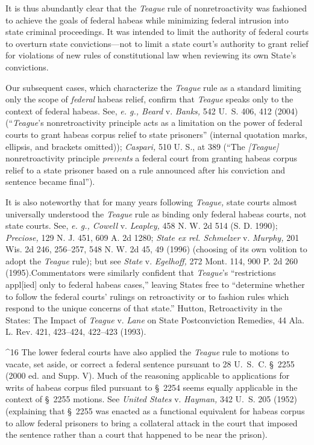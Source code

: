 {{{  It is thus abundantly clear that the \emph{Teague} rule of
nonretroactivity was fashioned to achieve the goals of federal habeas
while minimizing federal intrusion into state criminal proceedings. It
was intended to limit the authority of federal courts to overturn state
convictions---not to limit a state court's authority to grant relief
for violations of new \newpage  rules of constitutional law when reviewing
its own State's convictions.\footnotemark[16]

  Our subsequent cases, which characterize the \emph{Teague} rule as
a standard limiting only the scope of \emph{federal} habeas relief,
confirm that \emph{Teague} speaks only to the context of federal habeas.
See, \emph{e. g., Beard} v. \emph{Banks,} 542 U.~S. 406, 412 (2004)
(``\emph{Teague}'s nonretroactivity principle acts as a limitation
on the power of federal courts to grant habeas corpus relief to
state prisoners'' (internal quotation marks, ellipsis, and brackets
omitted)); \emph{Caspari,} 510 U. S., at 389 (``The \emph{[Teague]}
nonretroactivity principle \emph{prevents} a federal court from granting
habeas corpus relief to a state prisoner based on a rule announced after
his conviction and sentence became final'').

  It is also noteworthy that for many years following \emph{Teague,} state
courts almost universally understood the \emph{Teague} rule as binding only
federal habeas courts, not state courts. See, \emph{e. g., Cowell} v.
\emph{Leapley,} 458 N. W. 2d 514 (S. D. 1990); \emph{Preciose,} 129 N. J. 451,
609 A. 2d 1280; \emph{State ex rel. Schmelzer} v. \emph{Murphy,} 201 Wis. 2d
246, 256--257, 548 N. W. 2d 45, 49 (1996) (choosing of its own volition
to adopt the \emph{Teague} rule); but see \emph{State} v. \emph{Egelhoff,} 272
Mont. 114, 900 P. 2d 260 (1995).\footnotemark[17] Commentators were similarly
confident that \emph{Teague}'s ``restrictions appl[ied] only to federal
habeas \newpage  cases,'' leaving States free to ``determine whether
to follow the federal courts' rulings on retroactivity or to fashion
rules which respond to the unique concerns of that state.'' Hutton,
Retroactivity in the States: The Impact of \emph{Teague} v. \emph{Lane} on
State Postconviction Remedies, 44 Ala. L. Rev. 421, 423--424, 422--423
(1993).

^16 The lower federal courts have also applied the \emph{Teague} rule to
motions to vacate, set aside, or correct a federal sentence pursuant to
28 U.~S.~C. \S~2255 (2000 ed. and Supp. V). Much of the reasoning
applicable to applications for writs of habeas corpus filed pursuant to
\S~2254 seems equally applicable in the context of \S~2255 motions.
See \emph{United States} v. \emph{Hayman,} 342 U.~S. 205 (1952) (explaining
that \S~2255 was enacted as a functional equivalent for habeas corpus
to allow federal prisoners to bring a collateral attack in the court
that imposed the sentence rather than a court that happened to be near
the prison).

}}}
